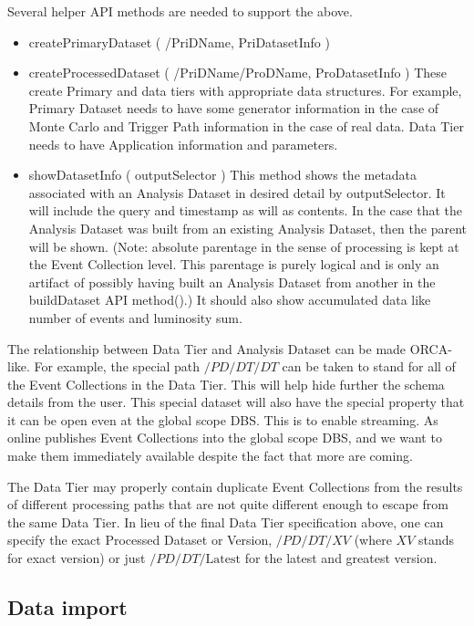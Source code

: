 \documentclass{cmspaper}
\begin{document}
Several helper API methods are needed to support the above.  

\begin{itemize}
\item  createPrimaryDataset ( /PriDName, PriDatasetInfo )
\item  createProcessedDataset ( /PriDName/ProDName, ProDatasetInfo )
      These create Primary and data tiers with appropriate data structures.
      For example, Primary Dataset needs to have some generator information in the 
      case of Monte Carlo and Trigger Path information in the case of real data.
      Data Tier needs to have Application information and parameters. 

\item  showDatasetInfo ( outputSelector )
      This method shows the metadata associated with an Analysis Dataset in desired
      detail by outputSelector.  It will include the query and timestamp as will as 
      contents.  In the case that the Analysis Dataset was built from an existing 
      Analysis Dataset, then the parent will be shown.  (Note: absolute parentage 
      in the sense of processing is kept at the Event Collection level.  This 
      parentage is purely logical and is only an artifact of possibly having built
      an Analysis Dataset from another in the buildDataset API method().)  It should 
      also show accumulated data like number of events and luminosity sum.
\end{itemize}

The relationship between Data Tier and Analysis Dataset can be made ORCA-like. 
For example, the special path $/PD/DT/DT$ can be taken to stand for 
all of the Event Collections in the Data Tier.  This will help hide further
the schema details from the user.   This special dataset will also have the special 
property that it can be open even at the global scope DBS.  This is to enable streaming.
As online publishes Event Collections into the global scope DBS, and we want to make 
them immediately available despite the fact that more are coming.

The Data Tier may properly contain duplicate Event Collections from the 
results of different processing paths that are not quite different enough 
to escape from the same Data Tier. In lieu of the final Data Tier specification
above, one can specify the exact Processed Dataset or Version, $/PD/DT/XV$ (where $XV$ 
stands for exact version) or just $/PD/DT/\mbox{Latest}$ for the latest and greatest version.

\subsection{Data import}
\end{document}
